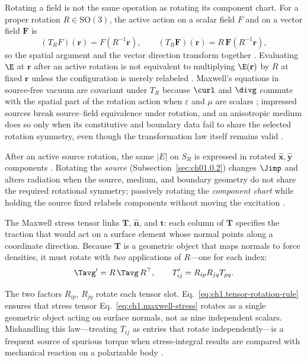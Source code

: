 Rotating a field is not the same operation as rotating its component chart. For a proper rotation $R\in\mathrm{SO}(3)$, the active action on a scalar field $F$ and on a vector field $\mathbf{F}$ is
\begin{equation}
\label{eq:ch1.field-rotation-operator}
(T_R F)(\mathbf{r})=F(R^{-1}\mathbf{r}),
\qquad
(T_R\mathbf{F})(\mathbf{r})=R\,\mathbf{F}(R^{-1}\mathbf{r}),
\end{equation}
so the spatial argument and the vector direction transform together \cite{jackson1999}. Evaluating $\E$ at $\mathbf{r}$ after an active rotation is not equivalent to multiplying $\E(\mathbf{r})$ by $R$ at fixed $\mathbf{r}$ unless the configuration is merely relabeled \cite{stratton1941}. Maxwell's equations in source-free vacuum are covariant under $T_R$ because $\curl$ and $\divg$ commute with the spatial part of the rotation action when $\varepsilon$ and $\mu$ are scalars \cite{maxwell1873}; impressed sources break source--field equivalence under rotation, and an anisotropic medium does so only when its constitutive and boundary data fail to share the selected rotation symmetry, even though the transformation law itself remains valid \cite{stratton1941}.

After an active source rotation, the same $|E|$ on $S_R$ is expressed in rotated $\hat{\mathbf{x}},\hat{\mathbf{y}}$ components \cite{hansen1988}. Rotating the \emph{source} (Subsection~\ref{sec:ch01.0.2}) changes $\Jimp$ and alters radiation when the source, medium, and boundary geometry do not share the required rotational symmetry; passively rotating the \emph{component chart} while holding the source fixed relabels components without moving the excitation \cite{stratton1941}.

The Maxwell stress tensor links $\mathbf{T}$, $\hat{\mathbf{n}}$, and $\mathbf{t}$: each column of $\mathbf{T}$ specifies the traction that would act on a surface element whose normal points along a coordinate direction. Because $\mathbf{T}$ is a geometric object that maps normals to force densities, it must rotate with \emph{two} applications of $R$---one for each index:
\begin{equation}
\label{eq:ch1.passive-rotation-action}\Tavg' = R\,\Tavg\,R^\top,
\qquad
T'_{ij}=R_{ip}R_{jq}T_{pq}.
\end{equation}
\addtocounter{equation}{-1}\label{eq:ch1.tensor-rotation-rule}%
\addtocounter{equation}{-1}\label{eq:ch1.vector-observable-covariance}%
The two factors \(R_{ip}\), \(R_{jq}\) rotate each tensor slot. Eq.~\eqref{eq:ch1.tensor-rotation-rule} ensures that stress tensor
Eq.~\eqref{eq:ch1.maxwell-stress} rotates as a single geometric object acting on surface normals, not as nine independent scalars.
Mishandling this law---treating $T_{ij}$ as entries that rotate independently---is a frequent source of spurious torque when stress-integral results are compared with mechanical reaction on a polarizable body \cite{beth1936}.

